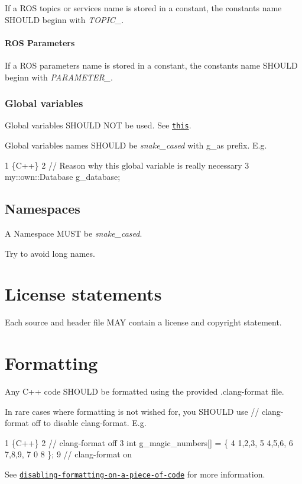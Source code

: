 If a R\+OS topics or services name is stored in a constant, the constant\textquotesingle{}s name S\+H\+O\+U\+LD beginn with {\itshape T\+O\+P\+I\+C\+\_\+}.

\paragraph*{R\+OS Parameters}

If a R\+OS parameters name is stored in a constant, the constant\textquotesingle{}s name S\+H\+O\+U\+LD beginn with {\itshape P\+A\+R\+A\+M\+E\+T\+E\+R\+\_\+}.

\subsubsection*{Global variables}

Global variables S\+H\+O\+U\+LD N\+OT be used. See \href{#globals}{\tt this}.

Global variables names S\+H\+O\+U\+LD be {\itshape snake\+\_\+cased} with {\ttfamily g\+\_\+}as prefix. E.\+g. 
\begin{DoxyCode}
1 \{C++\}
2 // Reason why this global variable is really necessary
3 my::own::Database g\_database;
\end{DoxyCode}


\subsection*{Namespaces}

A Namespace M\+U\+ST be {\itshape snake\+\_\+cased}.

Try to avoid long names.

\section*{License statements}

Each source and header file M\+AY contain a license and copyright statement.

\section*{Formatting}

Any {\ttfamily C++} code S\+H\+O\+U\+LD be formatted using the provided {\ttfamily .clang-\/format} file.

In rare cases where formatting is not wished for, you S\+H\+O\+U\+LD use {\ttfamily // clang-\/format off} to disable clang-\/format. E.\+g. 
\begin{DoxyCode}
1 \{C++\}
2 // clang-format off
3 int g\_magic\_numbers[] = \{
4     1,2,3,
5     4,5,6,
6     7,8,9,
7       0
8 \};
9 // clang-format on
\end{DoxyCode}
 See \href{https://clang.llvm.org/docs/ClangFormatStyleOptions.html#disabling-formatting-on-a-piece-of-code}{\tt disabling-\/formatting-\/on-\/a-\/piece-\/of-\/code} for more information.

